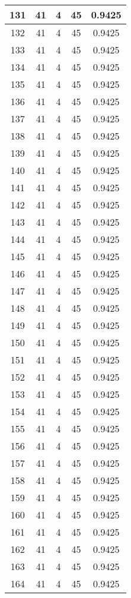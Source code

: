 \documentclass[letterpaper, 12pt]{article}
\begin{document}
\begin{longtable}{|c|c|c|c|c|}
\hline
131 & 41 & 4 & 45 & 0.9425 \\
\hline
132 & 41 & 4 & 45 & 0.9425 \\
\hline
133 & 41 & 4 & 45 & 0.9425 \\
\hline
134 & 41 & 4 & 45 & 0.9425 \\
\hline
135 & 41 & 4 & 45 & 0.9425 \\
\hline
136 & 41 & 4 & 45 & 0.9425 \\
\hline
137 & 41 & 4 & 45 & 0.9425 \\
\hline
138 & 41 & 4 & 45 & 0.9425 \\
\hline
139 & 41 & 4 & 45 & 0.9425 \\
\hline
140 & 41 & 4 & 45 & 0.9425 \\
\hline
141 & 41 & 4 & 45 & 0.9425 \\
\hline
142 & 41 & 4 & 45 & 0.9425 \\
\hline
143 & 41 & 4 & 45 & 0.9425 \\
\hline
144 & 41 & 4 & 45 & 0.9425 \\
\hline
145 & 41 & 4 & 45 & 0.9425 \\
\hline
146 & 41 & 4 & 45 & 0.9425 \\
\hline
147 & 41 & 4 & 45 & 0.9425 \\
\hline
148 & 41 & 4 & 45 & 0.9425 \\
\hline
149 & 41 & 4 & 45 & 0.9425 \\
\hline
150 & 41 & 4 & 45 & 0.9425 \\
\hline
151 & 41 & 4 & 45 & 0.9425 \\
\hline
152 & 41 & 4 & 45 & 0.9425 \\
\hline
153 & 41 & 4 & 45 & 0.9425 \\
\hline
154 & 41 & 4 & 45 & 0.9425 \\
\hline
155 & 41 & 4 & 45 & 0.9425 \\
\hline
156 & 41 & 4 & 45 & 0.9425 \\
\hline
157 & 41 & 4 & 45 & 0.9425 \\
\hline
158 & 41 & 4 & 45 & 0.9425 \\
\hline
159 & 41 & 4 & 45 & 0.9425 \\
\hline
160 & 41 & 4 & 45 & 0.9425 \\
\hline
161 & 41 & 4 & 45 & 0.9425 \\
\hline
162 & 41 & 4 & 45 & 0.9425 \\
\hline
163 & 41 & 4 & 45 & 0.9425 \\
\hline
164 & 41 & 4 & 45 & 0.9425 \\

\end{longtable}
\end{document}
